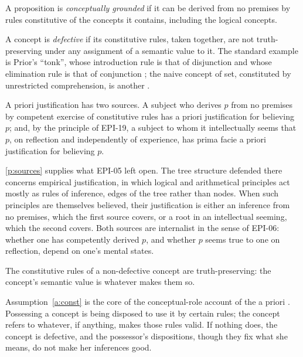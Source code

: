 \documentclass{situationist-preprint}
\begin{document}
\begin{definition}\label{d:ground}
A proposition is \emph{conceptually grounded} if it can be derived from no premises by rules constitutive of the concepts it contains, including the logical concepts.
\end{definition}

A concept is \emph{defective} if its constitutive rules, taken together, are not truth-preserving under any assignment of a semantic value to it. The standard example is Prior's \enquote{tonk}, whose introduction rule is that of disjunction and whose elimination rule is that of conjunction \citep{Prior1960}; the naive concept of set, constituted by unrestricted comprehension, is another \citep{Russell1903}.

\begin{principle}\label{p:sources}
A priori justification has two sources. A subject who derives $p$ from no premises by competent exercise of constitutive rules has a priori justification for believing $p$; and, by the principle of EPI-19, a subject to whom it intellectually seems that $p$, on reflection and independently of experience, has prima facie a priori justification for believing $p$.
\end{principle}

\ref{p:sources} supplies what EPI-05 left open. The tree structure defended there concerns empirical justification, in which logical and arithmetical principles act mostly as rules of inference, edges of the tree rather than nodes. When such principles are themselves believed, their justification is either an inference from no premises, which the first source covers, or a root in an intellectual seeming, which the second covers. Both sources are internalist in the sense of EPI-06: whether one has competently derived $p$, and whether $p$ seems true to one on reflection, depend on one's mental states.

\begin{assumption}[Constitution]\label{a:const}
The constitutive rules of a non-defective concept are truth-preserving: the concept's semantic value is whatever makes them so.
\end{assumption}

Assumption~\ref{a:const} is the core of the conceptual-role account of the a priori \citep{Boghossian1996,Boghossian2000}. Possessing a concept is being disposed to use it by certain rules; the concept refers to whatever, if anything, makes those rules valid. If nothing does, the concept is defective, and the possessor's dispositions, though they fix what she means, do not make her inferences good.
\end{document}
